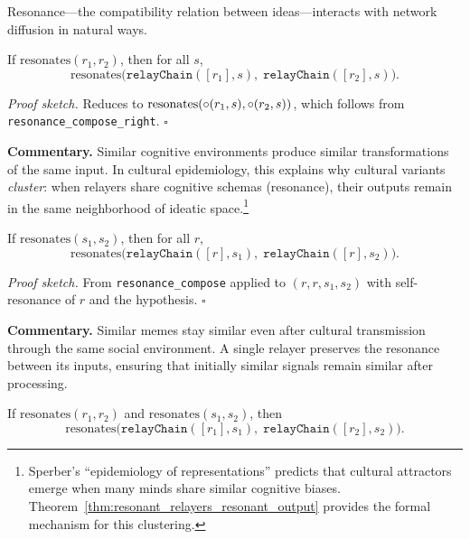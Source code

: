 Resonance---the compatibility relation between ideas---interacts with
network diffusion in natural ways.

\begin{theorem}
\label{thm:resonant_relayers_resonant_output}
If $\text{resonates}(r_1, r_2)$, then for all $s$,
\[
  \text{resonates}\bigl(\texttt{relayChain}([r_1], s),\;
  \texttt{relayChain}([r_2], s)\bigr).
\]
\end{theorem}

\noindent\textit{Proof sketch.}\quad
Reduces to $\text{resonates}(\circ(r_1, s), \circ(r_2, s))$,
which follows from \texttt{resonance\_compose\_right}.
\hfill$\square$

\medskip

\noindent\textbf{Commentary.}
Similar cognitive environments produce similar transformations of the same
input.  In cultural epidemiology, this explains why cultural variants
\emph{cluster}: when relayers share cognitive schemas (resonance), their
outputs remain in the same neighborhood of ideatic space.\footnote{Sperber's
``epidemiology of representations'' predicts that cultural attractors emerge
when many minds share similar cognitive biases.  Theorem~\ref{thm:resonant_relayers_resonant_output}
provides the formal mechanism for this clustering.}

\begin{theorem}
\label{thm:resonant_signals_same_relay}
If $\text{resonates}(s_1, s_2)$, then for all $r$,
\[
  \text{resonates}\bigl(\texttt{relayChain}([r], s_1),\;
  \texttt{relayChain}([r], s_2)\bigr).
\]
\end{theorem}

\noindent\textit{Proof sketch.}\quad
From \texttt{resonance\_compose} applied to $(r, r, s_1, s_2)$ with
self-resonance of $r$ and the hypothesis.
\hfill$\square$

\medskip

\noindent\textbf{Commentary.}
Similar memes stay similar even after cultural transmission through the same
social environment.  A single relayer preserves the resonance between its
inputs, ensuring that initially similar signals remain similar after
processing.

\begin{theorem}
\label{thm:two_chains_resonance}
If $\text{resonates}(r_1, r_2)$ and $\text{resonates}(s_1, s_2)$, then
\[
  \text{resonates}\bigl(\texttt{relayChain}([r_1], s_1),\;
  \texttt{relayChain}([r_2], s_2)\bigr).
\]
\end{theorem}

